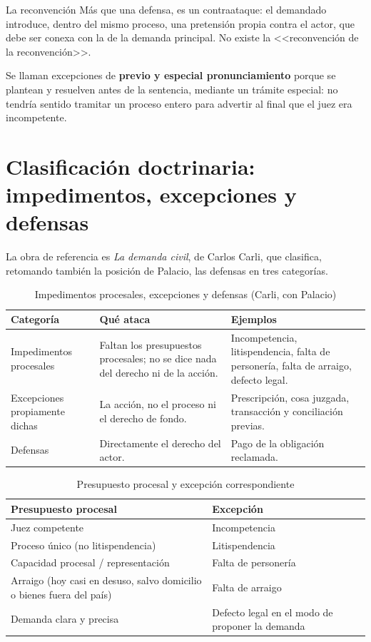 \documentclass[12pt,oneside]{book}
\begin{document}
\begin{definition}{La reconvención}
Más que una defensa, es un contraataque: el demandado introduce, dentro del mismo proceso, una pretensión propia contra el actor, que debe ser conexa con la de la demanda principal. No existe la <<reconvención de la reconvención>>.
\end{definition}

Se llaman excepciones de \textbf{previo y especial pronunciamiento} porque se plantean y resuelven antes de la sentencia, mediante un trámite especial: no tendría sentido tramitar un proceso entero para advertir al final que el juez era incompetente.

\section{Clasificación doctrinaria: impedimentos, excepciones y defensas}

La obra de referencia es \emph{La demanda civil}, de Carlos Carli, que clasifica, retomando también la posición de Palacio, las defensas en tres categorías.

\begin{table}[H]
\centering
\caption{Impedimentos procesales, excepciones y defensas (Carli, con Palacio)}
\begin{tabularx}{\textwidth}{>{\raggedright\arraybackslash}p{} >{\raggedright\arraybackslash}X >{\raggedright\arraybackslash}X}
\toprule
\textbf{Categoría} & \textbf{Qué ataca} & \textbf{Ejemplos} \\
\midrule
Impedimentos procesales & Faltan los presupuestos procesales; no se dice nada del derecho ni de la acción. & Incompetencia, litispendencia, falta de personería, falta de arraigo, defecto legal. \\
Excepciones propiamente dichas & La acción, no el proceso ni el derecho de fondo. & Prescripción, cosa juzgada, transacción y conciliación previas. \\
Defensas & Directamente el derecho del actor. & Pago de la obligación reclamada. \\
\bottomrule
\end{tabularx}
\end{table}

\begin{table}[H]
\centering
\caption{Presupuesto procesal y excepción correspondiente}
\begin{tabularx}{\textwidth}{>{\raggedright\arraybackslash}X >{\raggedright\arraybackslash}X}
\toprule
\textbf{Presupuesto procesal} & \textbf{Excepción} \\
\midrule
Juez competente & Incompetencia \\
Proceso único (no litispendencia) & Litispendencia \\
Capacidad procesal / representación & Falta de personería \\
Arraigo (hoy casi en desuso, salvo domicilio o bienes fuera del país) & Falta de arraigo \\
Demanda clara y precisa & Defecto legal en el modo de proponer la demanda \\
\bottomrule
\end{tabularx}
\end{table}
\end{document}
